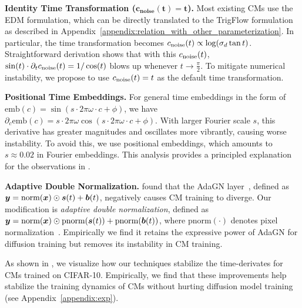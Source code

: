 \textbf{Identity Time Transformation ($\bm{c_{\text{noise}}(t)=t}$). }
Most existing CMs use the EDM formulation, which can be directly translated to the TrigFlow formulation as described in Appendix~\ref{appendix:relation_with_other_parameterization}. In particular, the time transformation becomes $c_{\text{noise}}(t) \propto \log(\sigma_d \tan t)$. Straightforward derivation shows that with this $c_{\text{noise}}(t)$, $\sin(t) \cdot \partial_t c_{\text{noise}}(t) = 1/\cos(t)$ blows up whenever $t \to \frac{\pi}{2}$. To mitigate numerical instability, we propose to use $c_{\text{noise}}(t) = t$ as the default time transformation.


\textbf{Positional Time Embeddings. }
For general time embeddings in the form of $\text{emb}(c) = \sin(s\cdot 2 \pi \omega \cdot c + \phi)$, we have $\partial_c \text{emb}(c) = s \cdot 2\pi \omega \cos(s\cdot 2 \pi \omega \cdot c + \phi)$. With larger Fourier scale $s$, this derivative has greater magnitudes and oscillates more vibrantly, causing worse instability. To avoid this, we use positional embeddings, which amounts to $s \approx 0.02$ in Fourier embeddings. This analysis provides a principled explanation for the observations in \citet{song2023ict}.

\textbf{Adaptive Double Normalization. }
\citet{song2023ict} found that the AdaGN layer~\citep{diffusion_beat_gan}, defined as ${\bm{y}} = \text{norm}({\bm{x}}) \odot {\bm{s}}(t) + {\bm{b}}(t)$, negatively causes CM training to diverge. Our modification is \textit{adaptive double normalization}, defined as \({\bm{y}} = \text{norm}({\bm{x}}) \odot \text{pnorm}({\bm{s}}(t)) + \text{pnorm}({\bm{b}}(t))\), where $\text{pnorm}(\cdot)$ denotes pixel normalization~\citep{karras2017progressive}. Empirically we find it retains the expressive power of AdaGN for diffusion training but removes its instability in CM training.



As shown in , we visualize how our techniques stabilize the time-derivates for CMs trained on CIFAR-10. Empirically, we find that these improvements help stabilize the training dynamics of CMs without hurting diffusion model training (see Appendix~\ref{appendix:exp}).







